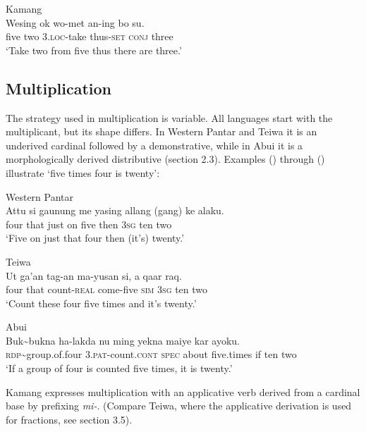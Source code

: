 \ea%
\label{bkm:Ref358115306}
Kamang\\
\gll  Wesing  ok  wo-met  an-ing  bo  su.   \\
    five  two   3.\textsc{loc-}take  thus\textsc{{}-set}  \textsc{conj} three   \\
\glt `Take two from five thus there are three.'
\z







\subsection{Multiplication}
The strategy used in multiplication is variable. All languages start with the multiplicant, but its shape differs. In Western Pantar and Teiwa it is an underived cardinal followed by a demonstrative, while in Abui it is a morphologically derived distributive (section 2.3). Examples () through ()  illustrate `five times four is twenty':


\ea%
\label{bkm:Ref358043144}
Western Pantar\\
\gll Attu  si  gaunung  me  yasing   allang  (gang)  ke alaku. \\
   four  that  just  on  five  then  3\textsc{sg } ten two   \\
\glt `Five on just that four then (it's) twenty.'
\z


\ea
Teiwa \\
 \gll   Ut  ga'an  tag-an  ma-yusan  si,  a   qaar raq.  \\
    four  that   count-\textsc{real } come-five  \textsc{sim}  \textsc{3sg} ten two  \\
 \glt `Count these four five times and it's twenty.'
\z



\ea
Abui \\
 \gll Buk\~{}bukna  ha-lakda  nu  ming  yekna  maiye  kar ayoku. \\
  \textsc{rdp}\~{}group.of.four  \textsc{3.pat}-count.\textsc{cont}  \textsc{spec}  about  five.times  if  ten two  \\
 \glt  `If a group of four is counted five times, it is twenty.'
\z



Kamang expresses multiplication with an applicative verb derived from a cardinal base by prefixing \textit{mi-}. (Compare Teiwa, where the applicative derivation is used for fractions, see section 3.5).




